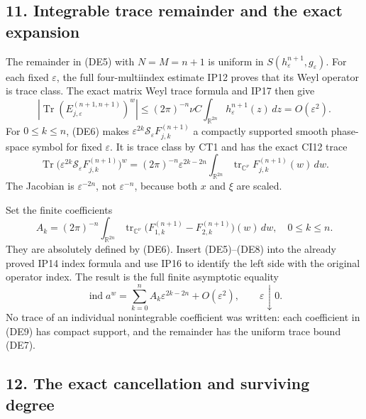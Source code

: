 \documentclass[
  11pt,
]{article}
\begin{document}
\subsection{11. Integrable trace remainder and the exact
expansion}\label{integrable-trace-remainder-and-the-exact-expansion}

The remainder in (DE5) with \(N=M=n+1\) is uniform in
\(S(h_\varepsilon^{n+1},g_\varepsilon)\). For each fixed
\(\varepsilon\), the full four-multiindex estimate IP12 proves that its
Weyl operator is trace class. The exact matrix Weyl trace formula and
IP17 then give \[
 \left|\operatorname{Tr}
       (E_{j,\varepsilon}^{(n+1,n+1)})^w\right|
 \le (2\pi)^{-n}\nu C
        \int_{\mathbb R^{2n}}h_\varepsilon^{n+1}(z)\,dz
 =O(\varepsilon^2).
 \tag{DE7}
\] For \(0\le k\le n\), (DE6) makes
\(\varepsilon^{2k}\mathscr S_\varepsilon F_{j,k}^{(n+1)}\) a compactly
supported smooth phase-space symbol for fixed \(\varepsilon\). It is
trace class by CT1 and has the exact CI12 trace \[
 \operatorname{Tr}
   \bigl(\varepsilon^{2k}
       \mathscr S_\varepsilon F_{j,k}^{(n+1)}\bigr)^w
 =(2\pi)^{-n}\varepsilon^{2k-2n}
       \int_{\mathbb R^{2n}}
          \operatorname{tr}_{\mathbb C^\nu}
                F_{j,k}^{(n+1)}(w)\,dw .
 \tag{DE8}
\] The Jacobian is \(\varepsilon^{-2n}\), not \(\varepsilon^{-n}\),
because both \(x\) and \(\xi\) are scaled.

Set the finite coefficients \[
 A_k=(2\pi)^{-n}
   \int_{\mathbb R^{2n}}
      \operatorname{tr}_{\mathbb C^\nu}
       \bigl(F_{1,k}^{(n+1)}
           -F_{2,k}^{(n+1)}\bigr)(w)\,dw,
       \quad 0\le k\le n .
 \tag{DE9}
\] They are absolutely defined by (DE6). Insert (DE5)--(DE8) into the
already proved IP14 index formula and use IP16 to identify the left side
with the original operator index. The result is the full finite
asymptotic equality \[
 \operatorname{ind}a^w
       =\sum_{k=0}^{n}A_k\varepsilon^{2k-2n}
              +O(\varepsilon^2),
       \qquad \varepsilon\downarrow0.
 \tag{DE10}
\] No trace of an individual nonintegrable coefficient was written: each
coefficient in (DE9) has compact support, and the remainder has the
uniform trace bound (DE7).

\subsection{12. The exact cancellation and surviving
degree}\label{the-exact-cancellation-and-surviving-degree}
\end{document}
